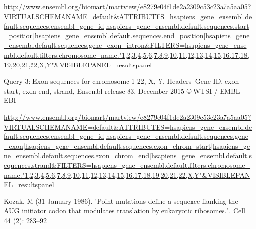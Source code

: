 \documentclass[10pt,letterpaper]{article}
\begin{document}
\begin{thebibliography}{10}
\url{http://www.ensembl.org/biomart/martview/e8279e04f1de2a2309c53c23a7a5aa05?VIRTUALSCHEMANAME=default&ATTRIBUTES=hsapiens_gene_ensembl.default.sequences.ensembl_gene_id|hsapiens_gene_ensembl.default.sequences.start_position|hsapiens_gene_ensembl.default.sequences.end_position|hsapiens_gene_ensembl.default.sequences.gene_exon_intron&FILTERS=hsapiens_gene_ensembl.default.filters.chromosome_name."1,2,3,4,5,6,7,8,9,10,11,12,13,14,15,16,17,18,19,20,21,22,X,Y"&VISIBLEPANEL=resultspanel}

Query 3: Exon sequences for chromosome 1-22, X, Y, Headers: Gene ID, exon start, exon end, strand, Ensembl release 83, December 2015 © WTSI / EMBL-EBI

\url{http://www.ensembl.org/biomart/martview/e8279e04f1de2a2309c53c23a7a5aa05?VIRTUALSCHEMANAME=default&ATTRIBUTES=hsapiens_gene_ensembl.default.sequences.ensembl_gene_id|hsapiens_gene_ensembl.default.sequences.gene_exon|hsapiens_gene_ensembl.default.sequences.exon_chrom_start|hsapiens_gene_ensembl.default.sequences.exon_chrom_end|hsapiens_gene_ensembl.default.sequences.strand&FILTERS=hsapiens_gene_ensembl.default.filters.chromosome_name."1,2,3,4,5,6,7,8,9,10,11,12,13,14,15,16,17,18,19,20,21,22,X,Y"&VISIBLEPANEL=resultspanel}

Kozak, M (31 January 1986). "Point mutations define a sequence flanking the AUG initiator codon that modulates translation by eukaryotic ribosomes.". Cell 44 (2): 283–92

\end{thebibliography}
\end{document}
